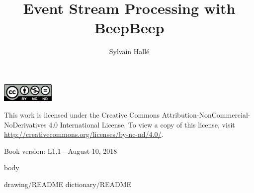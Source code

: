 \documentclass{lifmanual}
\title{Event Stream Processing with BeepBeep}
\author{Sylvain Hallé}
\begin{document}
\frontmatter

\newpage

\cleardoublepage

\newpage

\thispagestyle{empty}
\pagestyle{empty}
\rule{0in}{6in}
\noindent
\includegraphics[width=1in]{by-nc-nd}\\
{\sf\small
\noindent
This work is licensed under the Creative Commons Attribution-NonCommercial-NoDerivatives 4.0 International License. To view a copy of this license, visit \url{http://creativecommons.org/licenses/by-nc-nd/4.0/}.\\

\noindent
\rule{0in}{8pt}
\noindent
Book version: L1.1---August 10, 2018}


\tableofcontents
\newpage

\mainmatter
\thispagestyle{fancy}
\pagestyle{fancy}

{body}

\appendix
\renewcommand{\chaptername}{Appendix}
{drawing/README}
{dictionary/README}

\printindex

\cleardoublepage
\thispagestyle{empty}
\phantom{W}
\newpage

\end{document}

